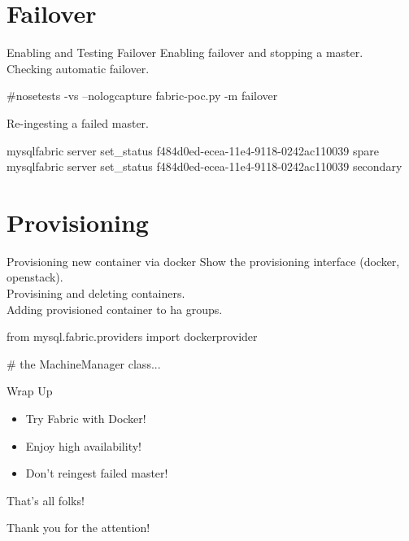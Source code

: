 \documentclass{beamer}[10]
\begin{document}
\section{Failover}
\begin{pyframe}{Enabling and Testing Failover}
Enabling failover and stopping a master. \\

Checking automatic failover. \\
\begin{bashcode}
#nosetests -vs --nologcapture fabric-poc.py -m failover
\end{bashcode}

Re-ingesting a failed master. \\
\begin{bashcode}
mysqlfabric server set_status  f484d0ed-ecea-11e4-9118-0242ac110039  spare
mysqlfabric server set_status  f484d0ed-ecea-11e4-9118-0242ac110039  secondary
\end{bashcode}
\end{pyframe}


\section{Provisioning}
\begin{pyframe}{Provisioning new container via docker}
Show the provisioning interface (docker, openstack). \\

Provisining and deleting containers. \\

Adding provisioned container to ha groups. \\

\begin{pycode}
from mysql.fabric.providers import dockerprovider

# the MachineManager class...

\end{pycode}
\end{pyframe}

\begin{pyframe}{Wrap Up}
\begin{itemize}
\item Try Fabric with Docker!
\item Enjoy high availability!
\item Don't reingest failed master!
\end{itemize}
\end{pyframe}


\begin{pyframe}{That's all folks!}
\begin{center}
Thank you for the attention! \\\\
\insertauthor
\end{center}
\end{pyframe}
\end{document}

